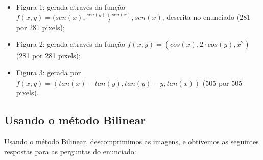 \documentclass[12pt,letterpaper]{article}
\begin{document}
	\begin{figure}[h]
	\end{figure}
	
	\begin{itemize}
		\item Figura 1: gerada através da função
		$f(x,y) = (sen(x), \frac{sen(y)+sen(x)}{2}, sen(x)$, descrita no enunciado (281 por 281 pixels);
		\item Figura 2: gerada através da função $f(x,y) = (cos(x), 2\cdot cos(y), x^2)$ (281 por 281 pixels);
		\item Figura 3: gerada por $f(x,y) = (tan(x) - tan(y), tan(y)- y, tan(x))$ (505 por 505 pixels).
	\end{itemize}
	
	\clearpage
	
	\subsection{Usando o método Bilinear}
	
	Usando o método Bilinear, descomprimimos as imagens, e obtivemos as seguintes respostas para as perguntas do enunciado:
	
\end{document}
